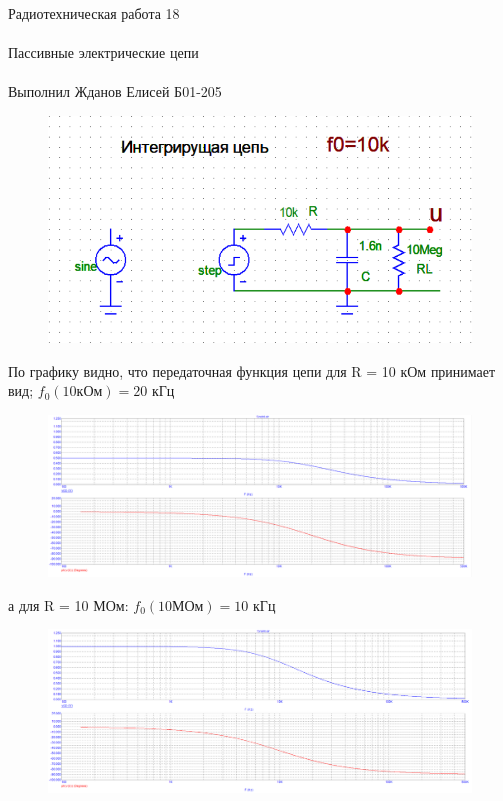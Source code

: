 \documentclass{astroedu-lab}
\begin{document}
\begin{problem}{\huge Радиотехническая работа 18\\\\Пассивные электрические цепи\\\\Выполнил Жданов Елисей Б01-205}
\begin{figure}[!h]
	\centering
	\includegraphics[width=1\textwidth]{1_6.png}
	\label{fig:boiler}
\end{figure}

По графику видно, что передаточная функция цепи для R = 10 кОм принимает вид; $f_0(10 \text{кОм}) = 20 \text{ кГц}$

\begin{figure}[!h]
	\centering
	\includegraphics[width=1\textwidth]{1_5.png}
	\label{fig:boiler}
\end{figure}


а для R = 10 МОм: $f_0(10 \text{МОм}) = 10 \text{ кГц}$

\begin{figure}[!h]
	\centering
	\includegraphics[width=1\textwidth]{1_4.png}
	\label{fig:boiler}
\end{figure}


\end{problem}
\end{document}
